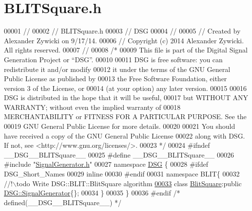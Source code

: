 \hypertarget{_b_l_i_t_square_8h_source}{\section{B\+L\+I\+T\+Square.\+h}
\label{_b_l_i_t_square_8h_source}
}

\begin{DoxyCode}
00001 \textcolor{comment}{//}
00002 \textcolor{comment}{//  BLITSquare.h}
00003 \textcolor{comment}{//  DSG}
00004 \textcolor{comment}{//}
00005 \textcolor{comment}{//  Created by Alexander Zywicki on 9/17/14.}
00006 \textcolor{comment}{//  Copyright (c) 2014 Alexander Zywicki. All rights reserved.}
00007 \textcolor{comment}{//}
00008 \textcolor{comment}{/*}
00009 \textcolor{comment}{ This file is part of the Digital Signal Generation Project or “DSG”.}
00010 \textcolor{comment}{}
00011 \textcolor{comment}{ DSG is free software: you can redistribute it and/or modify}
00012 \textcolor{comment}{ it under the terms of the GNU General Public License as published by}
00013 \textcolor{comment}{ the Free Software Foundation, either version 3 of the License, or}
00014 \textcolor{comment}{ (at your option) any later version.}
00015 \textcolor{comment}{}
00016 \textcolor{comment}{ DSG is distributed in the hope that it will be useful,}
00017 \textcolor{comment}{ but WITHOUT ANY WARRANTY; without even the implied warranty of}
00018 \textcolor{comment}{ MERCHANTABILITY or FITNESS FOR A PARTICULAR PURPOSE.  See the}
00019 \textcolor{comment}{ GNU General Public License for more details.}
00020 \textcolor{comment}{}
00021 \textcolor{comment}{ You should have received a copy of the GNU General Public License}
00022 \textcolor{comment}{ along with DSG.  If not, see <http://www.gnu.org/licenses/>.}
00023 \textcolor{comment}{ */}
00024 \textcolor{preprocessor}{#ifndef \_\_DSG\_\_BLITSquare\_\_}
00025 \textcolor{preprocessor}{#define \_\_DSG\_\_BLITSquare\_\_}
00026 \textcolor{preprocessor}{#include "\hyperlink{_signal_generator_8h}{SignalGenerator.h}"}
00027 \textcolor{keyword}{namespace }\hyperlink{namespace_d_s_g}{DSG} \{
00028 \textcolor{preprocessor}{#ifdef DSG\_Short\_Names}
00029     \textcolor{keyword}{inline}
00030 \textcolor{preprocessor}{#endif}
00031     \textcolor{keyword}{namespace }BLIT\{\textcolor{comment}{}
00032 \textcolor{comment}{        //!\(\backslash\)todo Write DSG::BLIT::BlitSquare algorithm}
\hypertarget{_b_l_i_t_square_8h_source_l00033}{}\hyperlink{class_d_s_g_1_1_b_l_i_t_1_1_blit_square}{00033} \textcolor{comment}{}        \textcolor{keyword}{class }\hyperlink{class_d_s_g_1_1_b_l_i_t_1_1_blit_square}{BlitSquare}:\textcolor{keyword}{public} \hyperlink{class_d_s_g_1_1_signal_generator}{DSG::SignalGenerator}\{\};
00034     \}
00035 \}
00036 \textcolor{preprocessor}{#endif }\textcolor{comment}{/* defined(\_\_DSG\_\_BLITSquare\_\_) */}\textcolor{preprocessor}{}
\end{DoxyCode}
